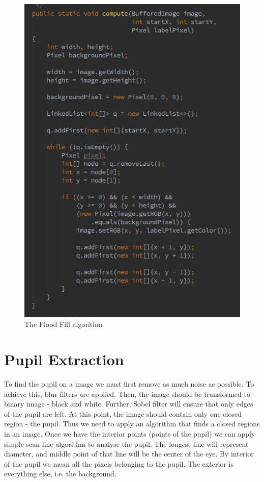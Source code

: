 \documentclass{article}
\begin{document}
%
%
\begin{figure}[H]
\centering

  \includegraphics[width=0.9\linewidth]{res/algorithms/flood_alg.png}

\caption{The Flood Fill algorithm}
\label{fig:flood_alg}
\end{figure}


\section{Pupil Extraction}
\label{sec:pupil}

To find the pupil on a image we must first remove as much noise as possible. To achieve this, blur filters are applied. Then, the image should be transformed to binary image - black and white. Further, Sobel filter will ensure that only edges of the pupil are left. At this point, the image should contain only one closed region - the pupil. Thus we need to apply an algorithm that finds a closed regions in an image. Once we have the interior points (points of the pupil) we can apply simple scan line algorithm to analyse the pupil. The longest line will represent diameter, and middle point of that line will be the center of the eye.
By interior of the pupil we mean all the pixels belonging to the pupil. The exterior is everything else, i.e. the background.
\end{document}
